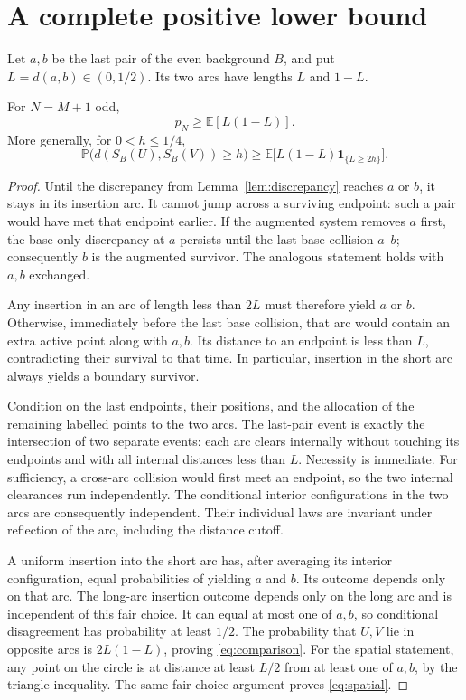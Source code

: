 \documentclass[11pt,letterpaper]{article}
\newcommand{\PP}{\mathbb P}\newcommand{\EE}{\mathbb E}
\newcommand{\ind}{\mathbf 1}\newcommand{\Exp}{\operatorname{Exp}}
\begin{document}
\section{A complete positive lower bound}\label{sec:lower}

Let $a,b$ be the last pair of the even background $B$, and put
$L=d(a,b)\in(0,1/2)$. Its two arcs have lengths $L$ and $1-L$.

\begin{lemma}\label{lem:last-comparison}
For $N=M+1$ odd,
\begin{equation}\label{eq:comparison}
 p_N\ge\EE[L(1-L)].
\end{equation}
More generally, for $0<h\le1/4$,
\begin{equation}\label{eq:spatial}
 \PP\bigl(d(S_B(U),S_B(V))\ge h\bigr)
 \ge\EE\bigl[L(1-L)\ind_{\{L\ge2h\}}\bigr].
\end{equation}
\end{lemma}
\begin{proof}
Until the discrepancy from Lemma~\ref{lem:discrepancy} reaches $a$ or $b$,
it stays in its insertion arc. It cannot jump across a surviving endpoint:
such a pair would have met that endpoint earlier. If the augmented system
removes $a$ first, the base-only discrepancy at $a$ persists until the last
base collision $a$--$b$; consequently $b$ is the augmented survivor. The
analogous statement holds with $a,b$ exchanged.

Any insertion in an arc of length less than $2L$ must therefore yield
$a$ or $b$. Otherwise, immediately before the last base collision, that
arc would contain an extra active point along with $a,b$. Its distance to
an endpoint is less than $L$, contradicting their survival to that time.
In particular, insertion in the short arc always yields a boundary survivor.

Condition on the last endpoints, their positions, and the allocation of
the remaining labelled points to the two arcs. The last-pair event is
exactly the intersection of two separate events: each arc clears internally
without touching its endpoints and with all internal distances less than
$L$. Necessity is immediate. For sufficiency, a cross-arc collision would
first meet an endpoint, so the two internal clearances run independently.
The conditional interior configurations in the two arcs are consequently
independent. Their individual laws are invariant under reflection of the
arc, including the distance cutoff.

A uniform insertion into the short arc has, after averaging its interior
configuration, equal probabilities of yielding $a$ and $b$. Its outcome
depends only on that arc. The long-arc insertion outcome depends only on
the long arc and is independent of this fair choice. It can equal at most
one of $a,b$, so conditional disagreement has probability at least $1/2$.
The probability that $U,V$ lie in opposite arcs is $2L(1-L)$, proving
\eqref{eq:comparison}. For the spatial statement, any point on the circle
is at distance at least $L/2$ from at least one of $a,b$, by the triangle
inequality. The same fair-choice argument proves \eqref{eq:spatial}.
\end{proof}
\end{document}
